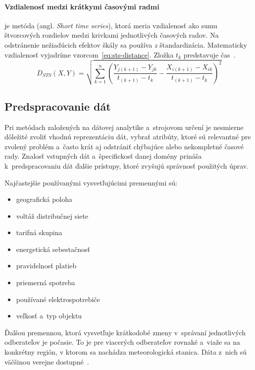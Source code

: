 \documentclass[a4paper,twoside,slovak,12pt,appendix]{article}
\begin{document}
\paragraph{Vzdialenosť medzi krátkymi časovými radmi} je metóda (angl.
\textit{Short time series}), ktorá meria vzdialenosť ako sumu štvorcových
rozdielov medzi krivkami jednotlivých časových radov. Na odstránenie nežiadúcich
efektov škály sa používa \textit{z} štandardizácia. Matematicky vzdialenosť
vyjadríme vzorcom~\ref{eq:sts-distance}. Zložka $t_k$ predstavuje
čas~\cite{WarrenLiao2005}.
\begin{equation}
	\label{eq:sts-distance}
  D_{STS} \left( X, Y \right) = \sqrt{ \sum_{k=1}^{n} \left(
    \frac{Y_{j \left( k+1 \right)} - Y_{jk}}{t_{\left( k+1 \right)} - t_k} -
    \frac{X_{i \left( k+1 \right)} - X_{ik}}{t_{\left( k+1 \right)} - t_k}
   \right)^2 }
\end{equation}


\subsection{Predspracovanie dát}
Pri metódach založených na dátovej analytike a~strojovom určení je nesmierne
dôležité zvoliť vhodnú reprezentáciu dát, vybrať atribúty, ktoré sú relevantné
pre zvolený problém a~často krát aj odstrániť chýbajúce alebo nekompletné časové
rady. Znalosť vstupných dát a~špecifickosť danej domény prináša
k~predspracovaniu dát ďalšie prístupy, ktoré zvyšujú správnosť použitých úprav.

Najčastejšie používanými vysvetľujúcimi premennými sú:
\begin{itemize}
  \item geografická poloha
  \item voltáž distribučnej siete
  \item tarifná skupina
  \item energetická sebestačnosť
  \item pravidelnosť platieb
  \item priemerná spotreba
  \item používané elektrospotrebiče
  \item veľkosť a~typ objektu
\end{itemize}
Ďalšou premennou, ktorá vysvetľuje krátkodobé zmeny v~správaní jednotlivých
odberateľov je počasie. To je pre viacerých odberateľov rovnaké a~viaže sa na
konkrétny región, v ktorom sa nachádza meteorologická stanica. Dáta z~nich sú
väčšinou verejne dostupné~\cite{Stankovic2014}.
\end{document}
